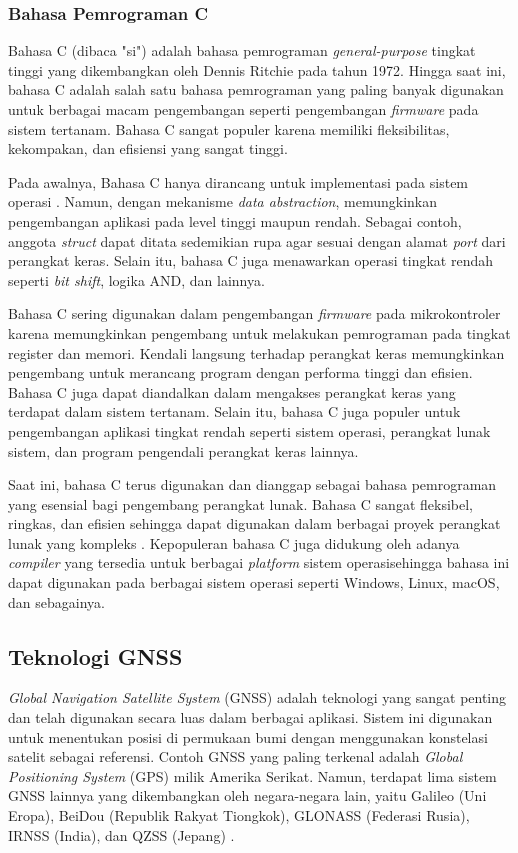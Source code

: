 \subsubsection{Bahasa Pemrograman C}
Bahasa C (dibaca "si") adalah bahasa pemrograman \textit{general-purpose} tingkat tinggi yang dikembangkan oleh Dennis Ritchie pada tahun 1972. Hingga saat ini, bahasa C adalah salah satu bahasa pemrograman yang paling banyak digunakan \cite{SO2022} untuk berbagai macam pengembangan seperti pengembangan \textit{firmware} pada sistem tertanam. Bahasa C sangat populer karena memiliki fleksibilitas, kekompakan, dan efisiensi yang sangat tinggi.

Pada awalnya, Bahasa C hanya dirancang untuk implementasi pada sistem operasi \cite{Ritchie1993}. Namun, dengan mekanisme \textit{data abstraction}, memungkinkan pengembangan aplikasi pada level tinggi maupun rendah. Sebagai contoh, anggota \textit{struct} dapat ditata sedemikian rupa agar sesuai dengan alamat \textit{port} dari perangkat keras. Selain itu, bahasa C juga menawarkan operasi tingkat rendah seperti \textit{bit shift}, logika AND, dan lainnya.

Bahasa C sering digunakan dalam pengembangan \textit{firmware} pada mikrokontroler karena memungkinkan pengembang untuk melakukan pemrograman pada tingkat register dan memori. Kendali langsung terhadap perangkat keras memungkinkan pengembang untuk merancang program dengan performa tinggi dan efisien. Bahasa C juga dapat diandalkan dalam mengakses perangkat keras yang terdapat dalam sistem tertanam. Selain itu, bahasa C juga populer untuk pengembangan aplikasi tingkat rendah seperti sistem operasi, perangkat lunak sistem, dan program pengendali perangkat keras lainnya.

Saat ini, bahasa C terus digunakan dan dianggap sebagai bahasa pemrograman yang esensial bagi pengembang perangkat lunak. Bahasa C sangat fleksibel, ringkas, dan efisien sehingga dapat digunakan dalam berbagai proyek perangkat lunak yang kompleks \cite{Deitel2016}. Kepopuleran bahasa C juga didukung oleh adanya \textit{compiler} yang tersedia untuk berbagai \textit{platform} sistem operasisehingga bahasa ini dapat digunakan pada berbagai sistem operasi seperti Windows, Linux, macOS, dan sebagainya.

\subsection{Teknologi GNSS}
\textit{Global Navigation Satellite System} (GNSS) adalah teknologi yang sangat penting dan telah digunakan secara luas dalam berbagai aplikasi. Sistem ini digunakan untuk menentukan posisi di permukaan bumi dengan menggunakan konstelasi satelit sebagai referensi. Contoh GNSS yang paling terkenal adalah \textit{Global Positioning System} (GPS) milik Amerika Serikat. Namun, terdapat lima sistem GNSS lainnya yang dikembangkan oleh negara-negara lain, yaitu Galileo (Uni Eropa), BeiDou (Republik Rakyat Tiongkok), GLONASS (Federasi Rusia), IRNSS (India), dan QZSS (Jepang) \cite{NationalCoordinationOfficeforSpace-BasedPositioning2021}.

